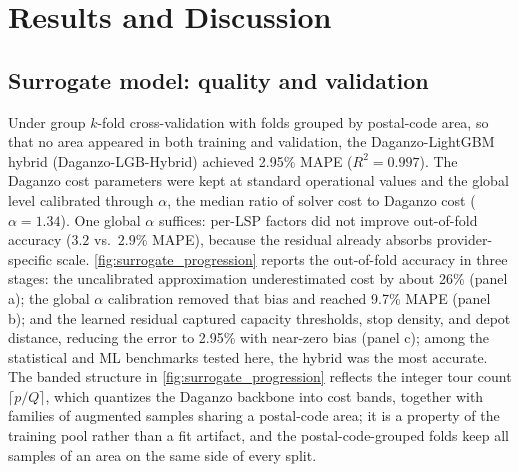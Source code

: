 \documentclass[preprint,12pt,authoryear]{elsarticle}
\begin{document}



\section{Results and Discussion}
\label{results}


\subsection{Surrogate model: quality and validation}
\label{sec:results_surrogate}



Under group $k$-fold cross-validation with folds grouped by postal-code area, so that no area appeared in both training and validation, the Daganzo-LightGBM hybrid (Daganzo-LGB-Hybrid) achieved 2.95\% MAPE ($R^2 = 0.997$). The Daganzo cost parameters were kept at standard operational values and the global level calibrated through $\alpha$, the median ratio of solver cost to Daganzo cost ($\alpha = 1.34$). One global $\alpha$ suffices: per-LSP factors did not improve out-of-fold accuracy ($3.2$ vs.\ $2.9\%$ MAPE), because the residual already absorbs provider-specific scale. \autoref{fig:surrogate_progression} reports the out-of-fold accuracy in three stages: the uncalibrated approximation underestimated cost by about 26\% (panel a); the global $\alpha$ calibration removed that bias and reached 9.7\% MAPE (panel b); and the learned residual captured capacity thresholds, stop density, and depot distance, reducing the error to 2.95\% with near-zero bias (panel c); among the statistical and ML benchmarks tested here, the hybrid was the most accurate. The banded structure in \autoref{fig:surrogate_progression} reflects the integer tour count $\lceil p/Q \rceil$, which quantizes the Daganzo backbone into cost bands, together with families of augmented samples sharing a postal-code area; it is a property of the training pool rather than a fit artifact, and the postal-code-grouped folds keep all samples of an area on the same side of every split.
\end{document}
